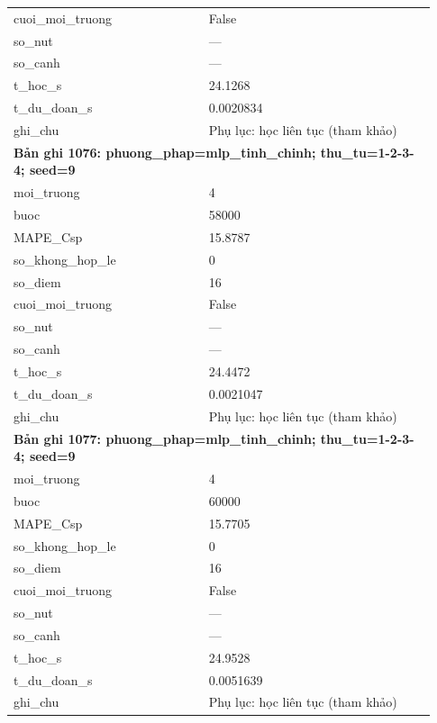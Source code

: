 \begin{longtable}{p{0.43\linewidth}p{0.50\linewidth}}
cuoi\_\allowbreak moi\_\allowbreak truong & False \\
so\_\allowbreak nut & — \\
so\_\allowbreak canh & — \\
t\_\allowbreak hoc\_\allowbreak s & 24.1268 \\
t\_\allowbreak du\_\allowbreak doan\_\allowbreak s & 0.0020834 \\
ghi\_\allowbreak chu & Phụ lục: học liên tục (tham khảo) \\
\midrule
\multicolumn{2}{p{0.95\linewidth}}{\textbf{Bản ghi 1076: phuong\_phap=mlp\_tinh\_chinh; thu\_tu=1-2-3-4; seed=9}} \\
moi\_\allowbreak truong & 4 \\
buoc & 58000 \\
MAPE\_\allowbreak Csp & 15.8787 \\
so\_\allowbreak khong\_\allowbreak hop\_\allowbreak le & 0 \\
so\_\allowbreak diem & 16 \\
cuoi\_\allowbreak moi\_\allowbreak truong & False \\
so\_\allowbreak nut & — \\
so\_\allowbreak canh & — \\
t\_\allowbreak hoc\_\allowbreak s & 24.4472 \\
t\_\allowbreak du\_\allowbreak doan\_\allowbreak s & 0.0021047 \\
ghi\_\allowbreak chu & Phụ lục: học liên tục (tham khảo) \\
\midrule
\multicolumn{2}{p{0.95\linewidth}}{\textbf{Bản ghi 1077: phuong\_phap=mlp\_tinh\_chinh; thu\_tu=1-2-3-4; seed=9}} \\
moi\_\allowbreak truong & 4 \\
buoc & 60000 \\
MAPE\_\allowbreak Csp & 15.7705 \\
so\_\allowbreak khong\_\allowbreak hop\_\allowbreak le & 0 \\
so\_\allowbreak diem & 16 \\
cuoi\_\allowbreak moi\_\allowbreak truong & False \\
so\_\allowbreak nut & — \\
so\_\allowbreak canh & — \\
t\_\allowbreak hoc\_\allowbreak s & 24.9528 \\
t\_\allowbreak du\_\allowbreak doan\_\allowbreak s & 0.0051639 \\
ghi\_\allowbreak chu & Phụ lục: học liên tục (tham khảo) \\

\end{longtable}
